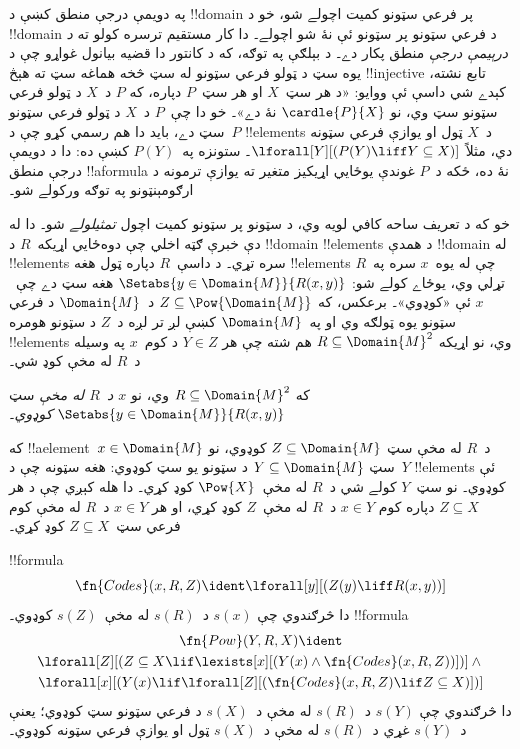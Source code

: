 \documentclass[../../../include/open-logic-section]{subfiles}
\begin{document}


\begin{explain}
په دويمې درجې منطق کښې د !!{domain} پر فرعي سټونو کميت اچولے شو،
خو د !!{domain} د فرعي سټونو پر سټونو ئې نۀ شو اچولے۔ دا کار
مستقيم ترسره کولو ته \emph{د درېيمې درجې} منطق پکار دے۔ د بېلګې
په توګه، که د کانتور دا قضيه بيانول غواړو چې د يوه سټ د ټولو
فرعي سټونو له سټ څخه هماغه سټ ته هېڅ !!{injective} تابع نشته،
کېدے شي داسې ئې ووايو: «د هر سټ~$X$ او هر سټ~$P$ دپاره، که
$P$ د~$X$ د ټولو فرعي سټونو سټ وي، نو $\cardle{P}{X}$ نۀ دے»۔
خو دا چې~$P$ د~$X$ د ټولو فرعي سټونو سټ دے، بايد دا هم
رسمي کړو چې د~$P$ !!{element}s د~$X$ ټول او يوازې فرعي
سټونه دي، مثلاً $\lforall[Y][(P(Y) \liff Y \subseteq X)]$۔
ستونزه په~$P(Y)$ کښې ده: دا د دويمې درجې منطق !!a{formula}
نۀ ده، ځکه د~$P$ غوندې يوځايي اړيکيز متغير ته يوازې
ترمونه د ارګومېنټونو په توګه ورکولے شو۔

خو که د تعريف ساحه کافي لويه وي، د سټونو پر سټونو کميت
اچول \emph{تمثيلولے} شو۔ دا له دې خبرې ګټه اخلي چې دوه‌ځايي
اړيکه~$R$ د !!{domain} !!{element}s د همدې !!{domain}
له !!{element}s سره تړي۔ د داسې~$R$ دپاره ټول هغه !!{element}s
چې له يوه~$x$ سره په~$R$ تړلي وي، يوځاے کولے شو:
$\Setabs{y \in
  \Domain{M}}{R(x,y)}$ هغه سټ دے چې~$x$ ئې «کوډوي»۔
برعکس، که $Z \subseteq \Pow{\Domain{M}}$ د~$\Domain{M}$
د فرعي سټونو يوه ټولګه وي او په~$\Domain{M}$ کښې لږ تر لږه
د~$Z$ د سټونو هومره !!{element}s وي، نو اړيکه
$R \subseteq \Domain{M}^2$ هم شته چې هر $Y \in Z$
د کوم~$x$ په وسيله د~$R$ له مخې کوډ شي۔
\end{explain}

\begin{defn}
که $R \subseteq \Domain{M}^2$ وي، نو \emph{$x$ د~$R$ له مخې}
سټ $\Setabs{y
  \in \Domain{M}}{R(x, y)}$ \emph{کوډوي}۔
\end{defn}

که !!a{element}~$x \in \Domain{M}$ د~$R$ له مخې سټ
$Z \subseteq \Domain{M}$ کوډوي، نو سټ $Y \subseteq \Domain{M}$
د سټونو يو سټ کوډوي: هغه سټونه چې د~$Y$ !!{element}s ئې
کوډوي۔ نو سټ~$Y$ کولے شي د~$R$ له مخې~$\Pow{X}$ کوډ کړي۔
دا هله کېږي چې د هر $Z \subseteq X$ دپاره کوم $x \in Y$
د~$R$ له مخې~$Z$ کوډ کړي، او هر $x \in Y$ د~$R$ له مخې
کوم فرعي سټ~$Z \subseteq X$ کوډ کړي۔

\begin{prop}
!!{formula}
  \[
  \fn{Codes}(x, R, Z) \ident \lforall[y][(Z(y) \liff
    R(x, y))]
  \]
دا څرګندوي چې $s(x)$ د~$s(R)$ له مخې~$s(Z)$ کوډوي۔
!!{formula}
\begin{multline*}
  \fn{Pow}(Y, R, X) \ident \\
  \lforall[Z][(Z \subseteq X \lif \lexists[x][(Y(x) \land
    \fn{Codes}(x, R, Z))])] \land {} \\ \lforall[x][(Y(x) \lif
  \lforall[Z][(\fn{Codes}(x, R, Z) \lif Z \subseteq X)])]
\end{multline*}
دا څرګندوي چې $s(Y)$ د~$s(R)$ له مخې د~$s(X)$ د فرعي
سټونو سټ کوډوي؛ يعنې د~$s(Y)$ غړي د~$s(R)$ له مخې
د~$s(X)$ ټول او يوازې فرعي سټونه کوډوي۔
\end{prop}
\end{document}
